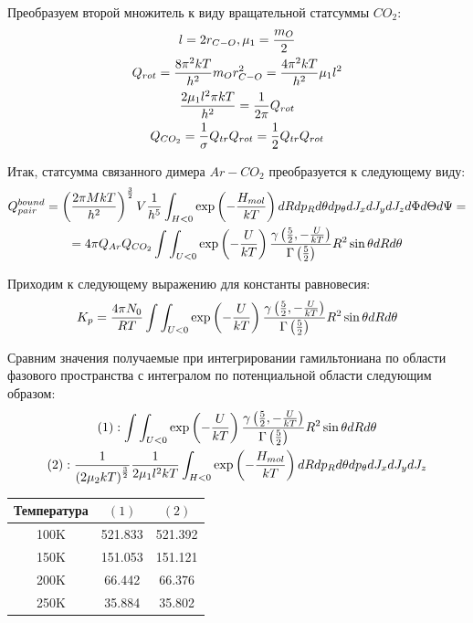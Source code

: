 \documentclass[14pt]{article}
\newcommand{\lb}{\left(}
\newcommand{\rb}{\right)}
\begin{document}
Преобразуем второй множитель к виду вращательной статсуммы $CO_2$:
\begin{gather}
	l = 2 r_{C-O}, \mu_1 = \frac{m_O}{2} \notag \\
	Q_{rot} = \frac{8 \pi^2 k T}{h^2} m_O r_{C-O}^2 = \frac{4 \pi^2 k T}{h^2} \mu_1 l^2 \notag \\
	\frac{2 \mu_1 l^2 \pi k T}{h^2} =  \frac{1}{2 \pi} Q_{rot} \notag \\
	Q_{CO_2} = \frac{1}{\sigma} Q_{tr} Q_{rot} = \frac{1}{2} Q_{tr} Q_{rot} \notag
\end{gather}

Итак, статсумма связанного димера $Ar-CO_2$ преобразуется к следующему виду:
\begin{gather}
	Q^{bound}_{pair} = \lb \frac{2 \pi M k T}{h^2} \rb^\frac{3}{2} V \frac{1}{h^5} \int_{H < 0} \exp \lb - \frac{H_{mol}}{kT} \rb dR dp_R d\theta dp_\theta dJ_x dJ_y dJ_z d \Phi d\Theta d\Psi = \notag \\ 
	= 4 \pi Q_{Ar} Q_{CO_2} \int \int_{U < 0} \exp \lb -\frac{U}{kT}\rb \frac{\gamma \lb \frac{5}{2}, - \frac{U}{kT} \rb}{\Gamma \lb \frac{5}{2} \rb} R^2 \sin \theta dR d\theta \notag
\end{gather}

Приходим к следующему выражению для константы равновесия:
\begin{gather}
	K_p = \frac{4 \pi N_0}{R T} \int \int_{U < 0} \exp \lb -\frac{U}{kT}\rb \frac{\gamma \lb \frac{5}{2}, - \frac{U}{kT} \rb}{\Gamma \lb \frac{5}{2} \rb} R^2 \sin \theta dR d\theta \notag 
\end{gather}

\newpage

Сравним значения получаемые при интегрировании гамильтониана по области фазового пространства с интегралом по потенциальной области следующим образом:
\begin{gather}
	(1): \int \int_{U < 0} \exp \lb -\frac{U}{kT} \rb \frac{\gamma \lb \frac{5}{2}, -\frac{U}{kT} \rb}{\Gamma \lb \frac{5}{2} \rb } R^2 \sin \theta dR d \theta \notag \\
	(2): \frac{1}{\lb 2 \mu_2 kT \rb^{\frac{3}{2}}} \frac{1}{2 \mu_1 l^2 kT} \int_{H < 0} \exp \lb - \frac{H_{mol}}{kT} \rb dR dp_R d\theta dp_\theta dJ_x dJ_y dJ_z \notag
\end{gather}

\begin{center}
\begin{tabular}{ccc}
	\hline
	Температура & $(1)$ & $(2)$ \\
	\hline
	100K & 521.833 & 521.392 \\
	150K & 151.053 & 151.121 \\
	200K & 66.442 &  66.376 \\
	250K & 35.884 & 35.802 \\
	\hline
\end{tabular} 
\end{center}
\end{document}
